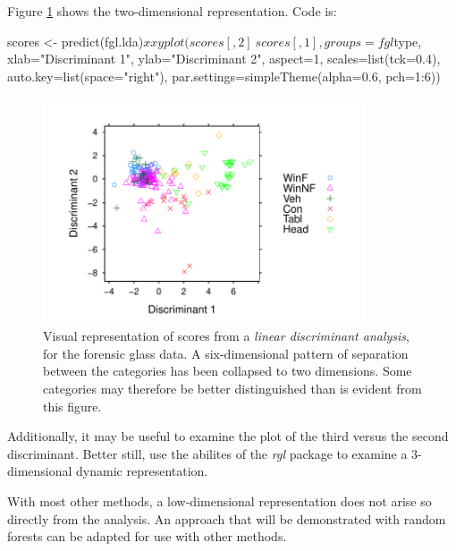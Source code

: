 
Figure \ref{fig:fgl} shows the two-dimensional
representation.  Code is:
\begin{Schunk}
\begin{Sinput}
scores <- predict(fgl.lda)$x
xyplot(scores[,2] ~ scores[,1], groups=fgl$type,
       xlab="Discriminant 1",
       ylab="Discriminant 2",
       aspect=1, scales=list(tck=0.4),
       auto.key=list(space="right"),
       par.settings=simpleTheme(alpha=0.6, pch=1:6))
\end{Sinput}
\end{Schunk}

\begin{figure}
\begin{Schunk}


\centerline{\includegraphics[width=0.85\textwidth]{figs/12-fgl-scores2D-1} }

\end{Schunk}
\caption{Visual representation of scores from a
  {\em linear discriminant analysis}, for the forensic glass data.  A
  six-dimensional pattern of separation between the categories has
  been collapsed to two dimensions.  Some categories may therefore
be better distinguished than is evident from this figure.\label{fig:fgl}}
\end{figure}

Additionally, it may be useful to examine the plot of the third
versus the second discriminant.  Better still, use the abilites of the
\textit{rgl} package to examine a 3-dimensional dynamic representation.

With most other methods, a low-dimensional representation does not
arise so directly from the analysis. An approach that will be
demonstrated with random forests can be adapted for use with
other methods.


